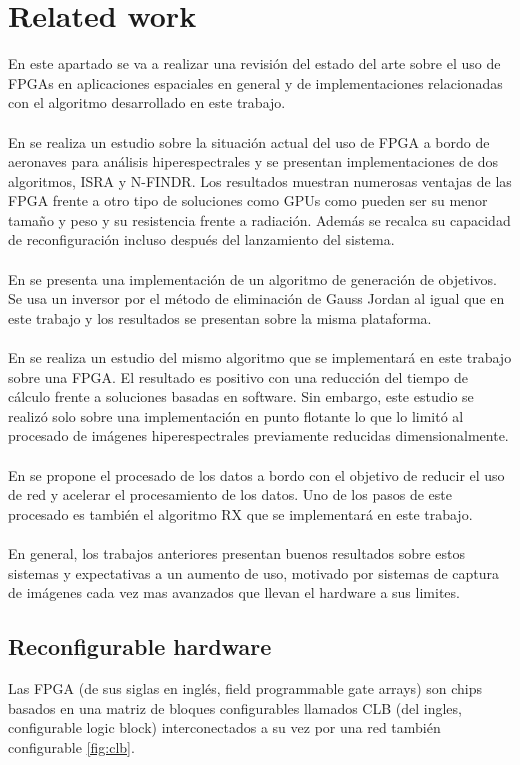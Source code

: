 \section{Related work}
En este apartado se va a realizar una revisión del estado del arte sobre el uso de FPGAs en aplicaciones espaciales en general y de implementaciones relacionadas con el algoritmo desarrollado en este trabajo.
\\
\\
En \cite{lopez_promise_2013} se realiza un estudio sobre la situación actual del uso de FPGA a bordo de aeronaves para análisis hiperespectrales y se presentan implementaciones de dos algoritmos, ISRA y N-FINDR. Los resultados muestran numerosas ventajas de las FPGA frente a otro tipo de soluciones como GPUs como pueden ser su menor tamaño y peso y su resistencia frente a radiación. Además se recalca su capacidad de reconfiguración incluso después del lanzamiento del sistema.
\\
\\
En \cite{gonzalez_fpga_2016} se presenta una implementación de un algoritmo de generación de objetivos. Se usa un inversor por el método de eliminación de Gauss Jordan al igual que en este trabajo y los resultados se presentan sobre la misma plataforma.
\\
\\
En \cite{colome_garcia_implementacion_2013} se realiza un estudio del mismo algoritmo que se implementará en este trabajo sobre una FPGA. El resultado es positivo con una reducción del tiempo de cálculo frente a soluciones basadas en software. Sin embargo, este estudio se realizó solo sobre una implementación en punto flotante lo que lo limitó al procesado de imágenes hiperespectrales previamente reducidas dimensionalmente.
\\
\\
En \cite{theiler_onboard_2018} se propone el procesado de los datos a bordo con el objetivo de reducir el uso de red y acelerar el procesamiento de los datos. Uno de los pasos de este procesado es también el algoritmo RX que se implementará en este trabajo.
\\
\\
En general, los trabajos anteriores presentan buenos resultados sobre estos sistemas y expectativas a un aumento de uso, motivado por sistemas de captura de imágenes cada vez mas avanzados que llevan el hardware a sus limites.

\subsection{Reconfigurable hardware}
Las FPGA (de sus siglas en inglés, field programmable gate arrays) son chips basados en una matriz de bloques configurables llamados CLB (del ingles, configurable logic block) interconectados a su vez por una red también configurable \ref{fig:clb}.

